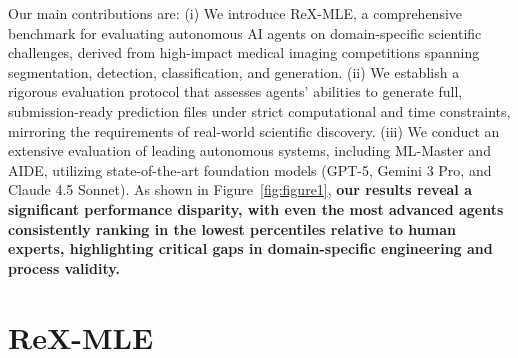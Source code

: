\documentclass{midl} %
\begin{document}


Our main contributions are: (i) We introduce ReX-MLE, a comprehensive benchmark for evaluating autonomous AI agents on domain-specific scientific challenges, derived from high-impact medical imaging competitions spanning segmentation, detection, classification, and generation.
(ii) We establish a rigorous evaluation protocol that assesses agents' abilities to generate full, submission-ready prediction files under strict computational and time constraints, mirroring the requirements of real-world scientific discovery.
(iii) We conduct an extensive evaluation of leading autonomous systems, including ML-Master and AIDE, utilizing state-of-the-art foundation models (GPT-5, Gemini 3 Pro, and Claude 4.5 Sonnet). As shown in Figure~\ref{fig:figure1}, \textbf{our results reveal a significant performance disparity, with even the most advanced agents consistently ranking in the lowest percentiles relative to human experts, highlighting critical gaps in domain-specific engineering and process validity.}



\section{ReX-MLE}
\label{sec:method}
\end{document}
